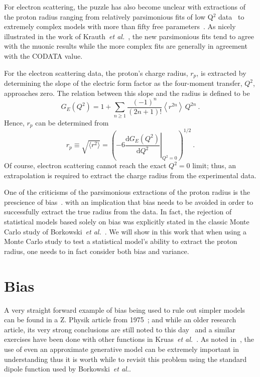 \documentclass[10pt,aps,prc,twocolumn]{revtex4-1}
\begin{document}
For electron scattering, the puzzle has also become unclear with extractions of the proton 
radius ranging from relatively parsimonious fits of 
low Q$^2$ data~\cite{Griffioen:2015hta,Horbatsch:2016ilr,Higinbotham:2015rja} to 
extremely complex models with more than fifty free parameters~\cite{Bernauer:2013tpr,Lee:2015jqa}.   
As nicely illustrated in the work of Krauth~{\it{et al.}}~\cite{Krauth:2017ijq}, the 
new parsimonious fits tend to agree with the muonic results while the more complex fits 
are generally in agreement with the CODATA value.

For the electron scattering data, the proton's charge radius, $r_p$, is extracted
by determining the slope of the electric form factor as the four-moment transfer, $Q^2$,
approaches zero.   The relation between this slope and 
the radius is defined to be
$$
G_E(Q^2)
   =  1
   +  \sum_{n\ge 1} \frac{(-1)^n}{(2n+1)!}
      \left\langle r^{2n} \right\rangle \, Q^{2n} \>.
$$
Hence, $r_p$ can be determined from
$$
  r_p \equiv \sqrt{ \langle r^2 \rangle}
   = \left( -6  \left. \frac{\mathrm{d} G_E(Q^2)}{\mathrm{d}Q^2}
    \right|_{Q^{2}=0} \right)^{1/2} \>.
 $$
Of course, electron scattering cannot reach the exact $Q^2 = 0$ limit; thus,
an extrapolation is required to extract the charge radius from the experimental data.

One of the criticisms of the parsimonious extractions of the proton radius is the prescience of bias~\cite{Sick:2017aor}.
with an implication that bias needs to be avoided in order to successfully extract the true radius from the data.
In fact, the rejection of statistical models based solely on bias was explicitly stated in the 
classic Monte Carlo study of Borkowski~{\it{et al.}}~\cite{Borkowski:1975}. 
We will show in this work that when using a Monte Carlo study to test a statistical model's ability
to extract the proton radius, one needs to in fact consider both bias and variance.

\section{Bias}

A very straight forward example of bias being used to rule out simpler models can be found in a Z. Physik
article from 1975~\cite{Borkowski:1975}; and while an older research article, its very strong conclusions are still 
noted to this day~\cite{Sick:2017aor} and a similar exercises have been done with other functions 
in Kruas~\textit{et al.}~\cite{Kraus:2014qua}.
As noted in~\cite{Hogg:2010yz}, the use of even an approximate generative model can be extremely 
important in understanding thus it is worth while to revisit this problem using the standard dipole 
function used by Borkowski~{\it{et al.}}. 
\end{document}
